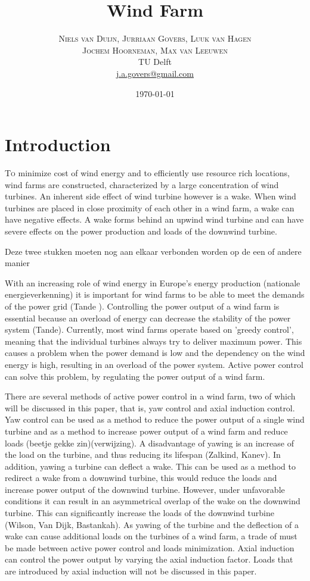 \documentclass[twoside,twocolumn]{article}
\title{Wind Farm} %
\author{%
	\textsc{Niels van Duijn, Jurriaan Govers, Luuk van Hagen}\\
	\textsc{Jochem Hoorneman, Max van Leeuwen}\\%
	\normalsize TU Delft \\ %
	\normalsize \href{mailto:j.a.govers@gmail.com}{j.a.govers@gmail.com} %
}
\date{\today} %
\begin{document}
	
	\maketitle
	
	
	\section{Introduction}
	
	\lettrine[nindent=0em,lines=3]To minimize cost of wind energy and to efficiently use resource rich locations, wind farms are constructed, characterized by a large concentration of wind turbines. An inherent side effect of wind turbine however is a wake. When wind turbines are placed in close proximity of each other in a wind farm, a wake can have negative effects. A wake forms behind an upwind wind turbine and can have severe effects on the power production and loads of the downwind turbine. 

Deze twee stukken moeten nog aan elkaar verbonden worden op de een of andere manier

With an increasing role of wind energy in Europe's energy production (nationale energieverkenning) it is important for wind farms to be able to meet the demands of the power grid (Tande ). Controlling the power output of a wind farm is essential because an overload of energy can decrease the stability of the power system (Tande). Currently, most wind farms operate based on 'greedy control', meaning that the individual turbines always try to deliver maximum power. This causes a problem when the power demand is low and the dependency on the wind energy is high, resulting in an overload of the power system. Active power control can solve this problem, by regulating the power output of a wind farm.

There are several methods of active power control in a wind farm, two of which will be discussed in this paper, that is, yaw control and axial induction control. Yaw control can be used as a method to reduce the power output of a single wind turbine and as a method to increase power output of a wind farm and reduce loads (beetje gekke zin)(verwijzing). A disadvantage of yawing is an increase of the load on the turbine, and thus reducing its lifespan (Zalkind, Kanev). In addition, yawing a turbine can deflect a wake. This can be used as a method to redirect a wake from a downwind turbine, this would reduce the loads and increase power output of the downwind turbine. However, under unfavorable conditions it can result in an asymmetrical overlap of the wake on the downwind turbine. This can significantly increase the loads of the downwind turbine (Wilson, Van Dijk, Bastankah). As yawing of the turbine and the deflection of a wake can cause additional loads on the turbines of a wind farm, a trade of must be made between active power control and loads minimization. Axial induction can control the power output by varying the axial induction factor. Loads that are introduced by axial induction will not be discussed in this paper. 
\end{document}
